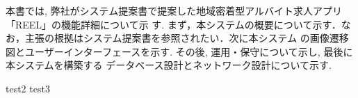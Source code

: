本書では, 弊社がシステム提案書で提案した地域密着型アルバイト求人アプリ「REEL」の機能詳細について示
す. まず，本システムの概要について示す．なお，主張の根拠はシステム提案書を参照されたい．次に本システム
の画像遷移図とユーザーインターフェースを示す. その後, 運用・保守について示し, 最後に本システムを構築する
データベース設計とネットワーク設計について示す.

test2
test3
